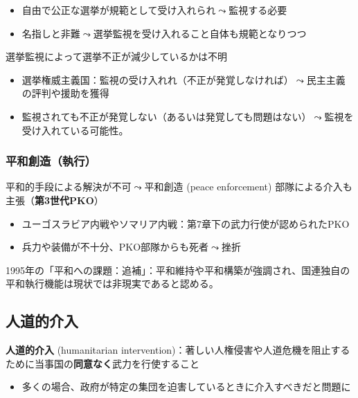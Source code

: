 \documentclass[
  xelatex,
  ja=standard]{bxjsarticle}
\providecommand{\tightlist}{%
  \setlength{\itemsep}{0pt}\setlength{\parskip}{0pt}}\usepackage{longtable,booktabs,array}
\begin{document}
\begin{itemize}
\tightlist
\item
  自由で公正な選挙が規範として受け入れられ\(\leadsto\)監視する必要
\item
  名指しと非難\(\leadsto\)選挙監視を受け入れること自体も規範となりつつ\citep{hyde2011}
\end{itemize}

選挙監視によって選挙不正が減少しているかは不明

\begin{itemize}
\tightlist
\item
  選挙権威主義国：監視の受け入れれ（不正が発覚しなければ）\(\leadsto\)民主主義の評判や援助を獲得
\item
  監視されても不正が発覚しない（あるいは発覚しても問題はない）\(\leadsto\)監視を受け入れている可能性。
\end{itemize}

\hypertarget{ux5e73ux548cux5275ux9020ux57f7ux884c}{%
\subsubsection{平和創造（執行）}\label{ux5e73ux548cux5275ux9020ux57f7ux884c}}

平和的手段による解決が不可\(\leadsto\)平和創造 (peace enforcement)
部隊による介入も主張（\textbf{第3世代PKO}）

\begin{itemize}
\tightlist
\item
  ユーゴスラビア内戦やソマリア内戦：第7章下の武力行使が認められたPKO
\item
  兵力や装備が不十分、PKO部隊からも死者\(\leadsto\)挫折
\end{itemize}

1995年の「平和への課題：追補」：平和維持や平和構築が強調され、国連独自の平和執行機能は現状では非現実であると認める。

\hypertarget{ux4ebaux9053ux7684ux4ecbux5165}{%
\subsection{人道的介入}\label{ux4ebaux9053ux7684ux4ecbux5165}}

\textbf{人道的介入} (humanitarian
intervention)：著しい人権侵害や人道危機を阻止するために当事国の\textbf{同意なく}武力を行使すること

\begin{itemize}
\tightlist
\item
  多くの場合、政府が特定の集団を迫害しているときに介入すべきだと問題に
\end{itemize}
\end{document}
